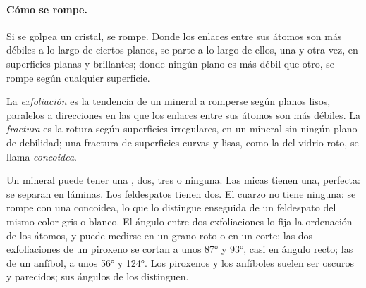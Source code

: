 \paragraph{Cómo se rompe.} Si se golpea un cristal, se rompe. Donde los
enlaces entre sus átomos son más débiles a lo largo de ciertos planos, se
parte a lo largo de ellos, una y otra vez, en superficies planas y brillantes;
donde ningún plano es más débil que otro, se rompe según cualquier superficie.

\begin{definition}\label{def:g11:minerals:cleavage}
La \emph{exfoliación} es la tendencia de un
mineral a romperse según planos lisos, paralelos a direcciones en las que los
enlaces entre sus átomos son más débiles. La \emph{fractura}
es la rotura según superficies irregulares, en un mineral sin ningún plano de
debilidad; una fractura de superficies curvas y lisas, como la del vidrio
roto, se llama \emph{concoidea}.
\end{definition}

Un mineral puede tener una , dos, tres o ninguna. Las micas tienen
una, perfecta: se separan en láminas. Los feldespatos tienen dos. El cuarzo no
tiene ninguna: se rompe con una  concoidea, lo que lo distingue enseguida
de un feldespato del mismo color gris o blanco. El ángulo entre dos
exfoliaciones lo fija la ordenación de los átomos, y puede medirse en un grano
roto o en un corte: las dos exfoliaciones de un piroxeno se cortan a unos
\ang{87} y \ang{93}, casi en ángulo recto; las de un anfíbol, a unos \ang{56} y
\ang{124}. Los piroxenos y los anfíboles suelen ser oscuros y parecidos; sus
ángulos de  los distinguen.

